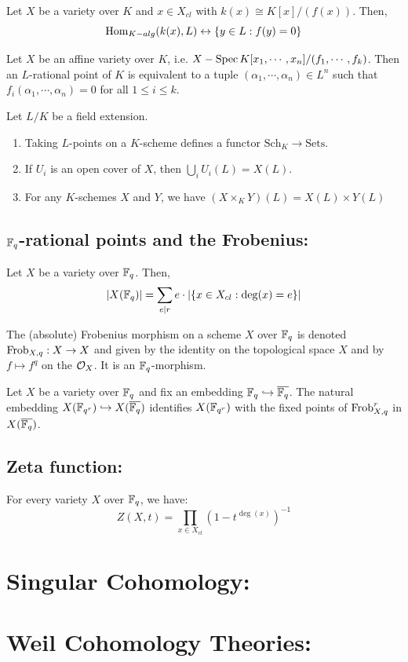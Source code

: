 \documentclass[12pt]{article}
\begin{document}
\begin{proposition}
    Let $X$ be a variety over $K$ and $x \in X_{cl}$ with $k(x) \cong K[x]/(f(x))$. Then, 
    \[ \operatorname{Hom}_{K-alg}(k(x), L) \leftrightarrow  \{ y \in L : f(y) = 0\}\]
\end{proposition}


\begin{proposition}
    Let $X$ be an affine variety over $K$, i.e. $X - \operatorname{Spec} K[x_1, \cdots, x_n]/(f_1, \cdots, f_k)$. Then an $L$-rational point of $K$ is equivalent to a tuple $(\alpha_1, \cdots, \alpha_n) \in L^n$ such that $f_i(\alpha_1, \cdots, \alpha_n) = 0$ for all $1 \leq i \leq k$.
\end{proposition}

\begin{proposition}
    Let $L/K$ be a field extension. 
    \begin{enumerate}
        \item Taking $L$-points on a $K$-scheme defines a functor $\mathrm{Sch}_K \to \mathrm{Sets}$.
        \item If $U_i$ is an open cover of $X$, then $\bigcup_i U_i(L) = X(L)$. 
        \item For any $K$-schemes $X$ and $Y$, we have $(X \times_K Y)(L) = X(L) \times Y(L)$
    \end{enumerate}
\end{proposition}

\subsection{$\mathbb F_q$-rational points and the Frobenius:}
\begin{proposition}
    Let $X$ be a variety over $\mathbb F_q$. Then, 
    \[ |X(\mathbb F_q)| = \sum_{e | r} e \cdot | \{x \in X_{cl} : \deg(x) = e\}| \]
\end{proposition}

\begin{definition}
    The (absolute) Frobenius morphism on a scheme $X$ over $\mathbb F_q$ is denoted $\operatorname{Frob}_{X,q}: X \to X$ and given by the identity on the topological space $X$ and by $f \mapsto f^q$ on the $\mathcal{O}_X$. It is an $\mathbb F_q$-morphism.
\end{definition}

\begin{theorem}
    Let $X$ be a variety over $\mathbb F_q$ and fix an embedding $\mathbb F_q \hookrightarrow \overline{\mathbb F_q}$. The natural embedding $X(\mathbb F_{q^r}) \hookrightarrow X(\overline{\mathbb F_q})$ identifies $X(\mathbb F_{q^r})$ with the fixed points of $\operatorname{Frob}_{X,q}^r$ in $X(\overline{\mathbb F_q})$.
\end{theorem}

\subsection{Zeta function:}
\begin{proposition}
    For every variety $X$ over $\mathbb F_q$, we have: 
    \[ Z(X, t) = \prod_{x \in X_{cl}} (1 - t^{\deg(x)})^{-1}\]
\end{proposition}

\section{Singular Cohomology:}


\section{Weil Cohomology Theories:}
\end{document}
